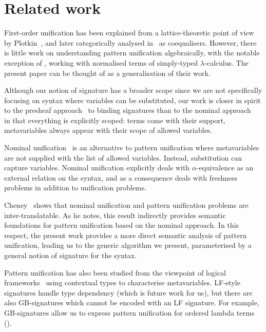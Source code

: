 \section{Related work}

\label{sec:related-work}

First-order unification has been explained from a lattice-theoretic
point of view by Plotkin~\citet{plotkinunification}, and later categorically
analysed in~\citet[Section 9.7]{DBLP:books/daglib/0068768,Goguen89whatis,10.5555/92134}
as coequalisers. However, there is little work on understanding pattern
unification algebraically, with the notable exception of \citet{vezzosi2014categorical},
working with normalised terms of simply-typed $\lambda$-calculus.
The present paper can be thought of as a generalisation of their
work.

Although our notion of signature has a broader scope since we are
not specifically focusing on syntax where variables can be substituted,
our work is closer in spirit to the presheaf approach~\citet{fiore:presheaf}
to binding signatures than to the nominal approach~\citet{PittsAM:newaas}
in that everything is explicitly scoped: terms come with their support,
metavariables always appear with their scope of allowed variables.

Nominal unification~\citet{10.1007/978-3-540-45220-1_41} is an alternative
to pattern unification where metavariables are not supplied with the
list of allowed variables. Instead, substitution can capture variables.
Nominal unification explicitly deals with $\alpha$-equivalence as
an external relation on the syntax, and as a consequence deals with
freshness problems in addition to unification problems. 

Cheney~\citet{cheney2005relating} shows that nominal unification
and pattern unification problems are inter-translatable. As he notes,
this result indirectly provides semantic foundations for pattern unification
based on the nominal approach. In this respect, the present work provides
a more direct semantic analysis of pattern unification, leading us
to the generic algorithm we present, parameterised by a general notion
of signature for the syntax.

Pattern unification has also been studied from the viewpoint of logical
frameworks~\citet{pientka2003tabled,DBLP:conf/icfp/NanevskiPP03,DBLP:journals/tocl/NanevskiPP08,DBLP:conf/tlca/AbelP11}
using contextual types to characterise metavariables. LF-style signatures
handle type dependency (which is future work for us), but there are
also GB-signatures which cannot be encoded with an LF signature. For
example, GB-signatures allow us to express pattern unification for
ordered lambda terms ().

